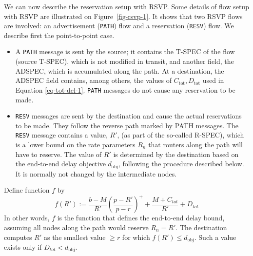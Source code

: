 We can now describe the reservation setup with RSVP. Some details
of flow setup with RSVP are illustrated on
Figure~\ref{fig-rsvp-1}. It shows that two RSVP flows are
involved: an advertisement (\texttt{PATH}) flow and a reservation
(\texttt{RESV}) flow. We describe first the point-to-point case.
\begin{itemize}
   \item A \texttt{PATH} message is sent by the source; it
   contains
    the T-SPEC of the flow (source T-SPEC), which is not modified in
    transit, and another field, the ADSPEC, which is accumulated along
    the path.  At a destination, the ADSPEC field contains, among
    others,  the values of
   $C_{\mbox{tot}}, D_{\mbox{tot}}$ used in Equation \ref{eq-tot-del-1}.
    \texttt{PATH} messages do not cause any reservation to be made.
    \item  \texttt{RESV} messages are sent by the destination and cause
    the actual reservations to be made. They follow the reverse path
    marked by
    PATH messages. The \texttt{RESV} message contains a value, $R'$, (as part of the
    so-called R-SPEC), which is a lower bound on the rate parameters $R_n$ that routers
    along the path will have to reserve. The value of $R'$ is
    determined by the destination based on the end-to-end delay objective
    $d_{\mbox{obj}}$, following the procedure described below. It
    is normally not changed by the intermediate nodes.
\end{itemize}

\begin{figure}[!htbp]
\end{figure}

Define function $f$ by
    $$
    f(R') :=
    \frac{b-M}{R'} \left(
                  \frac{p-R'}{p-r}
                  \right)^{+}
    + \frac{M + C_{tot}}{R'}  +  D_{tot}
    $$
In other words, $f$ is the function that defines the end-to-end
delay bound, assuming all nodes along the path would reserve $R_n=
R'$. The destination computes $R'$ as the smallest value $\geq r$
for which $f(R') \leq d_{\mbox{obj}}$. Such a value exists only if
$D_{tot} < d_{\mbox{obj}}$.

